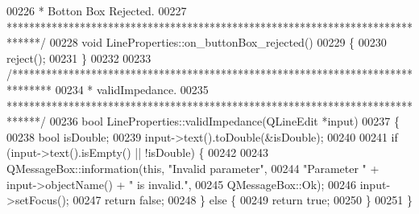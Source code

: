 \begin{DoxyCode}
00226 \textcolor{comment}{ * Botton Box Rejected.}
00227 \textcolor{comment}{ ******************************************************************************/}
00228 \textcolor{keywordtype}{void} LineProperties::on\_buttonBox\_rejected()
00229 \{
00230   reject();
00231 \}
00232 
00233 \textcolor{comment}{/*******************************************************************************}
00234 \textcolor{comment}{ * validImpedance.}
00235 \textcolor{comment}{ ******************************************************************************/}
00236 \textcolor{keywordtype}{bool} LineProperties::validImpedance(QLineEdit *input)
00237 \{
00238   \textcolor{keywordtype}{bool} isDouble;
00239   input->text().toDouble(&isDouble);
00240 
00241   \textcolor{keywordflow}{if} (input->text().isEmpty() || !isDouble) \{
00242 
00243     QMessageBox::information(\textcolor{keyword}{this}, \textcolor{stringliteral}{"Invalid parameter"},
00244                              \textcolor{stringliteral}{"Parameter "} + input->objectName() + \textcolor{stringliteral}{" is invalid."},
00245                              QMessageBox::Ok);
00246     input->setFocus();
00247     \textcolor{keywordflow}{return} \textcolor{keyword}{false};
00248   \} \textcolor{keywordflow}{else} \{
00249     \textcolor{keywordflow}{return} \textcolor{keyword}{true};
00250   \}
00251 \}
\end{DoxyCode}

